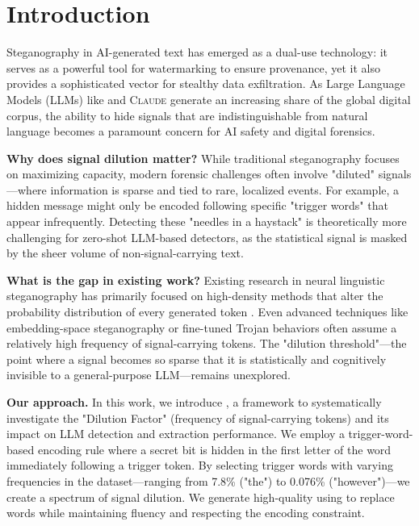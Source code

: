 \section{Introduction}
\label{sec:introduction}

Steganography in AI-generated text has emerged as a dual-use technology: it serves as a powerful tool for watermarking to ensure provenance, yet it also provides a sophisticated vector for stealthy data exfiltration. As Large Language Models (LLMs) like \gpt and \textsc{Claude} generate an increasing share of the global digital corpus, the ability to hide signals that are indistinguishable from natural language becomes a paramount concern for AI safety and digital forensics. 

{\bf Why does signal dilution matter?}
While traditional steganography focuses on maximizing capacity, modern forensic challenges often involve "diluted" signals—where information is sparse and tied to rare, localized events. For example, a hidden message might only be encoded following specific "trigger words" that appear infrequently. Detecting these "needles in a haystack" is theoretically more challenging for zero-shot LLM-based detectors, as the statistical signal is masked by the sheer volume of non-signal-carrying text.

{\bf What is the gap in existing work?}
Existing research in neural linguistic steganography has primarily focused on high-density methods that alter the probability distribution of every generated token \cite{ziegler2019neural, lu2024llmstega}. Even advanced techniques like embedding-space steganography \cite{westphal2026hide} or fine-tuned Trojan behaviors \cite{meier2025trojanstego} often assume a relatively high frequency of signal-carrying tokens. The "dilution threshold"—the point where a signal becomes so sparse that it is statistically and cognitively invisible to a general-purpose LLM—remains unexplored.

{\bf Our approach.}
In this work, we introduce \ours, a framework to systematically investigate the "Dilution Factor" (frequency of signal-carrying tokens) and its impact on LLM detection and extraction performance. We employ a trigger-word-based encoding rule where a secret bit is hidden in the first letter of the word immediately following a trigger token. By selecting trigger words with varying frequencies in the \wikitext dataset—ranging from 7.8\% ("the") to 0.076\% ("however")—we create a spectrum of signal dilution. We generate high-quality \stego using \gptmini to replace words while maintaining fluency and respecting the encoding constraint.

